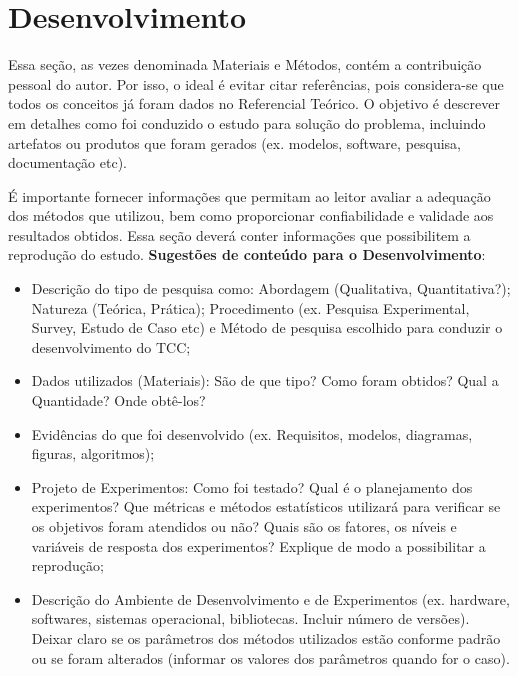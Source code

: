 \section{Desenvolvimento}
\label{desenvolvimento}

Essa seção, as vezes denominada Materiais e Métodos, contém a contribuição pessoal do autor. Por isso, o ideal é evitar citar referências, pois considera-se que todos os conceitos já foram dados no Referencial Teórico. O objetivo é descrever em detalhes como foi conduzido o estudo para solução do problema, incluindo artefatos ou produtos que foram gerados (ex. modelos, software, pesquisa, documentação etc).

É importante fornecer informações que permitam ao leitor avaliar a adequação dos métodos que utilizou, bem como proporcionar confiabilidade e validade aos resultados obtidos. Essa seção deverá conter informações que possibilitem a reprodução do estudo. \textbf{Sugestões de conteúdo para o Desenvolvimento}:

\begin{itemize}
    \item Descrição do tipo de pesquisa como: Abordagem (Qualitativa, Quantitativa?); Natureza (Teórica, Prática); Procedimento (ex. Pesquisa Experimental, Survey, Estudo de Caso etc) e Método de pesquisa escolhido para conduzir o desenvolvimento do TCC;
    
    \item Dados utilizados (Materiais): São de que tipo? Como foram obtidos? Qual a Quantidade? Onde obtê-los?
    
    \item Evidências do que foi desenvolvido (ex. Requisitos, modelos, diagramas, figuras, algoritmos);
    
    \item Projeto de Experimentos: Como foi testado? Qual é o planejamento dos experimentos? Que métricas e métodos estatísticos utilizará para verificar se os objetivos foram atendidos ou não? Quais são os fatores, os níveis e variáveis de resposta dos experimentos? Explique de modo a possibilitar a reprodução;
    
    \item Descrição do Ambiente de Desenvolvimento e de Experimentos (ex. hardware, softwares, sistemas operacional, bibliotecas. Incluir número de versões). Deixar claro se os parâmetros dos métodos utilizados estão conforme padrão ou se foram alterados (informar os valores dos parâmetros quando for o caso).
\end{itemize}

